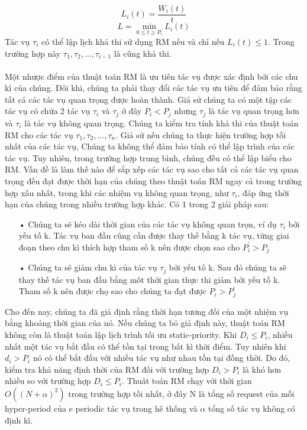 \documentclass[a4paper,10pt]{report}
\begin{document}
\begin{displaymath}
L_i(t) = \frac{W_i(t)}{t}
\end{displaymath}
\begin{displaymath}
L = \min_{0 \leq t \geq P_i} L_i(t)
\end{displaymath}
Tác vụ $\tau_i$ có thể lập lịch khả thi sử dụng RM nếu và chỉ nếu $L_i(t) \leq 1$. Trong trường hợp này $\tau_1, \tau_2, \ldots, \tau_{i-1}$ là cũng khả thi. \\ \\ 
Một nhược điểm của thuật toán RM là ưu tiên tác vụ được xác định bởi các chu kì của chúng. Đôi khi, chúng ta phải thay đổi các tác vụ ưu tiên để đảm bảo rằng tất cả các tác vụ quan trọng được hoàn thành. Giả sử chúng ta có một tập các tác vụ có chứa 2 tác vụ $\tau_i$ và $\tau_j$ ở đây $P_i < P_j$ nhưng $\tau_j$ là tác vụ quan trọng hơn và $\tau_i$ là tác vụ không quan trọng. Chúng ta kiểm tra tính khả thi của thuật toán RM cho các tác vụ $\tau_1, \tau_2, \ldots, \tau_n$. Giả sử nếu chúng ta thực hiện trường hợp tồi nhất của các tác vụ, Chúng ta không thể đảm bảo tính có thể lập trình của các tác vụ. Tuy nhiên, trong trường hợp trung bình, chúng đều có thể lập biểu cho RM. Vấn đề là làm thế nào để sắp xếp các tác vụ sao cho tất cả các tác vụ quan trọng đều đạt được thời hạn của chúng theo thuật toán RM ngay cả trong trường hợp xấu nhất, trong khi các nhiệm vụ không quan trọng, như $\tau_i$, đáp ứng thời hạn của chúng trong nhiều trường hợp khác. Có 1 trong 2 giải pháp sau:
\begin{itemize}
\item[•] Chúng ta sẽ kéo dài thời gian của các tác vụ không quan trọn, ví dụ $\tau_i$ bởi yếu tố k. Tác vụ ban đầu cũng cần được thay thế bằng k tác  vụ, từng giai đoạn theo chu kì thích hợp tham số k nên được chọn sao cho $P_i^{'} > P_j$
\item[•] Chúng ta sẽ giảm chu kì của tác vụ $\tau_j$ bởi yếu tố k. Sau đó chúng ta sẽ thay thế tác vụ ban đầu bằng môt thời gian thực thi giảm bởi yếu tố k. Tham số k nên được chọ sao cho chúng ta đạt được $P_i > P_j^{'}$
\end{itemize}
Cho đến nay, chúng ta đã giả định rằng thời hạn tương đối của một nhiệm vụ bằng khoảng thời gian của nó. Nếu chúng ta bỏ giả định này, thuật toán RM không còn là thuật toán lập lịch trình tối ưu static-priority. Khi $D_i \leq P_i$, nhiều nhất  một tác vụ bắt đầu có thể tồn tại trong bất kì thời điểm. Tuy nhiên khi $d_i > P_i$ nó có thể bắt đầu với nhiều tác vụ như nhau tồn tại đồng thời. Do đó, kiểm tra khả năng định thời của RM đối với trường hợp $D_i > P_i $ là khó hơn nhiều so với trường hợp $D_i \leq P_i$. Thuât toán RM chạy với thời gian $O((N + \alpha)^2)$ trong trường hợp tồi nhất, ở đây N là tổng số request của mỗi hyper-period của e periodic tác vụ trong hê thống và $\alpha$ tổng số tác vụ không có định kì. 
\end{document}
